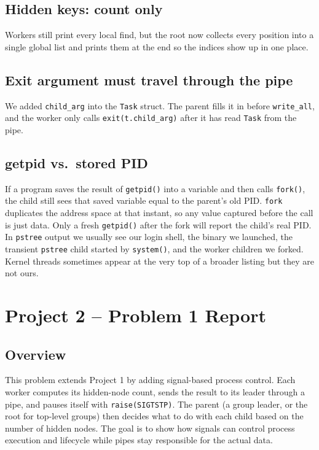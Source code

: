 \documentclass[11pt]{article}
\begin{document}
\subsection*{Hidden keys: count only}
Workers still print every local find, but the root now collects every position
into a single global list and prints them at the end so the indices show up in
one place.

\subsection*{Exit argument must travel through the pipe}
We added \texttt{child\_arg} into the \texttt{Task} struct. The parent fills it
in before \texttt{write\_all}, and the worker only calls
\texttt{exit(t.child\_arg)} after it has read \texttt{Task} from the pipe.

\subsection*{getpid vs.\ stored PID}
If a program saves the result of \texttt{getpid()} into a variable and then
calls \texttt{fork()}, the child still sees that saved variable equal to the
parent's old PID. \texttt{fork} duplicates the address space at that instant,
so any value captured before the call is just data. Only a fresh
\texttt{getpid()} after the fork will report the child's real PID. In
\texttt{pstree} output we usually see our login shell, the binary we launched,
the transient \texttt{pstree} child started by \texttt{system()}, and the
worker children we forked. Kernel threads sometimes appear at the very top of a
broader listing but they are not ours.

\section{Project 2 -- Problem 1 Report}

\subsection*{Overview}
This problem extends Project 1 by adding signal-based process control. Each
worker computes its hidden-node count, sends the result to its leader through
a pipe, and pauses itself with \texttt{raise(SIGTSTP)}. The parent (a group
leader, or the root for top-level groups) then decides what to do with each
child based on the number of hidden nodes. The goal is to show how signals can
control process execution and lifecycle while pipes stay responsible for the
actual data.
\end{document}
